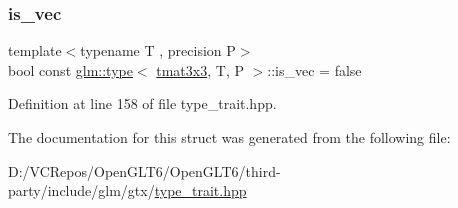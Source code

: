 \subsubsection{\texorpdfstring{is\_vec}{is\_vec}}
{\footnotesize\ttfamily template$<$typename T , precision P$>$ \\
bool const \mbox{\hyperlink{structglm_1_1type}{glm\+::type}}$<$ \mbox{\hyperlink{structglm_1_1tmat3x3}{tmat3x3}}, T, P $>$\+::is\+\_\+vec = false\hspace{0.3cm}{\ttfamily [static]}}



Definition at line 158 of file type\+\_\+trait.\+hpp.



The documentation for this struct was generated from the following file\+:\begin{DoxyCompactItemize}
\item 
D\+:/\+V\+C\+Repos/\+Open\+G\+L\+T6/\+Open\+G\+L\+T6/third-\/party/include/glm/gtx/\mbox{\hyperlink{type__trait_8hpp}{type\+\_\+trait.\+hpp}}\end{DoxyCompactItemize}
